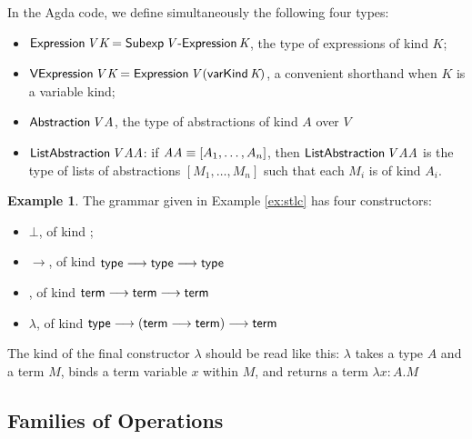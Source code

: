 \documentclass{article}
\theoremstyle{definition}
\newtheorem{example}[lm]{Example}
\begin{document}
In the Agda code, we define simultaneously the following four types:
\begin{itemize}
 \item $\AgdaFunction{Expression} \, \AgdaBound{V} \, \AgdaBound{K} = \AgdaDatatype{Subexp} \, \AgdaBound{V} \, \AgdaInductiveConstructor{-Expression} \, \AgdaBound{K}$,
the type of expressions of kind $K$;
\item $\AgdaFunction{VExpression} \, \AgdaBound{V} \, \AgdaBound{K} = \AgdaFunction{Expression} \,
\AgdaBound{V} \, (\AgdaInductiveConstructor{varKind} \, \AgdaBound{K})$, a convenient
shorthand when $K$ is a variable kind;
\item $\AgdaFunction{Abstraction} \, \AgdaBound{V} \, \AgdaBound{A}$, the type of abstractions
of kind $A$ over $V$
\item $\AgdaFunction{ListAbstraction} \, \AgdaBound{V} \, \AgdaBound{AA}$: if $\AgdaBound{AA} \equiv [ A_1, \ldots, A_n ]$,
then $\AgdaFunction{ListAbstraction} \, \AgdaBound{V} \, \AgdaBound{AA}$ is the type of lists of abstractions $[M_1, \ldots, M_n]$
such that each $M_i$ is of kind $A_i$.
\end{itemize}

  
\begin{example}
The grammar given in Example \ref{ex:stlc} has four constructors:
\begin{itemize}
 \item
$\bot$, of kind ;
\item
$\rightarrow$, of kind $\AgdaFunction{type} \longrightarrow \AgdaFunction{type} \longrightarrow \AgdaFunction{type}$
\item
{}, of kind $\AgdaFunction{term} \longrightarrow \AgdaFunction{term} \longrightarrow \AgdaFunction{term}$
\item
$\lambda$, of kind $\AgdaFunction{type} \longrightarrow (\AgdaFunction{term} \longrightarrow \AgdaFunction{term}) \longrightarrow \AgdaFunction{term}$
\end{itemize}
The kind of the final constructor $\lambda$ should be read like this: $\lambda$ takes a type $A$
and a term $M$, binds a term variable $x$ within $M$, and returns a term $\lambda x:A.M$

\end{example}

\subsection{Families of Operations}
\end{document}
